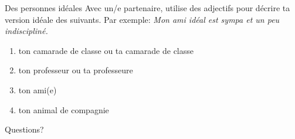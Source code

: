 \documentclass{beamer}
\begin{document}
  \begin{frame}{Des personnes idéales}
    Avec un/e partenaire, utilise des adjectifs pour décrire ta version idéale des suivants.
    Par exemple:
    \emph{Mon ami idéal est sympa et un peu indiscipliné.} \\
    \begin{enumerate}
      \item ton camarade de classe ou ta camarade de classe
      \item ton professeur ou ta professeure
      \item ton ami(e)
      \item ton animal de compagnie
    \end{enumerate}
  \end{frame}

  \begin{frame}{}
    \begin{center}
      \Large Questions?
    \end{center}
  \end{frame}
\end{document}
